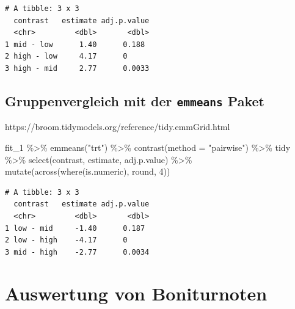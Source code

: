 \documentclass[
  letterpaper,
  DIV=11,
  oneside]{scrreport}
\newenvironment{Shaded}{\begin{snugshade}}{\end{snugshade}}
\newcommand{\AttributeTok}[1]{\textcolor[rgb]{0.40,0.45,0.13}{#1}}
\newcommand{\DecValTok}[1]{\textcolor[rgb]{0.68,0.00,0.00}{#1}}
\newcommand{\FunctionTok}[1]{\textcolor[rgb]{0.28,0.35,0.67}{#1}}
\newcommand{\NormalTok}[1]{\textcolor[rgb]{0.00,0.23,0.31}{#1}}
\newcommand{\SpecialCharTok}[1]{\textcolor[rgb]{0.37,0.37,0.37}{#1}}
\newcommand{\StringTok}[1]{\textcolor[rgb]{0.13,0.47,0.30}{#1}}
\begin{document}
\begin{verbatim}
# A tibble: 3 x 3
  contrast   estimate adj.p.value
  <chr>         <dbl>       <dbl>
1 mid - low      1.40      0.188 
2 high - low     4.17      0     
3 high - mid     2.77      0.0033
\end{verbatim}

\hypertarget{gruppenvergleich-mit-der-emmeans-paket}{%
\subsection{\texorpdfstring{Gruppenvergleich mit der \texttt{emmeans}
Paket}{Gruppenvergleich mit der emmeans Paket}}\label{gruppenvergleich-mit-der-emmeans-paket}}

https://broom.tidymodels.org/reference/tidy.emmGrid.html

\begin{Shaded}
\begin{Highlighting}[]
\NormalTok{fit\_1 }\SpecialCharTok{\%\textgreater{}\%} 
  \FunctionTok{emmeans}\NormalTok{(}\StringTok{"trt"}\NormalTok{) }\SpecialCharTok{\%\textgreater{}\%} 
  \FunctionTok{contrast}\NormalTok{(}\AttributeTok{method =} \StringTok{"pairwise"}\NormalTok{) }\SpecialCharTok{\%\textgreater{}\%} 
\NormalTok{  tidy }\SpecialCharTok{\%\textgreater{}\%} 
  \FunctionTok{select}\NormalTok{(contrast, estimate, adj.p.value) }\SpecialCharTok{\%\textgreater{}\%} 
  \FunctionTok{mutate}\NormalTok{(}\FunctionTok{across}\NormalTok{(}\FunctionTok{where}\NormalTok{(is.numeric), round, }\DecValTok{4}\NormalTok{))}
\end{Highlighting}
\end{Shaded}

\begin{verbatim}
# A tibble: 3 x 3
  contrast   estimate adj.p.value
  <chr>         <dbl>       <dbl>
1 low - mid     -1.40      0.187 
2 low - high    -4.17      0     
3 mid - high    -2.77      0.0034
\end{verbatim}

\hypertarget{auswertung-von-boniturnoten}{%
\section{Auswertung von
Boniturnoten}\label{auswertung-von-boniturnoten}}
\end{document}
